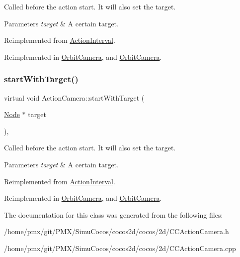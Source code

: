 Called before the action start. It will also set the target.


\begin{DoxyParams}{Parameters}
{\em target} & A certain target. \\
\hline
\end{DoxyParams}


Reimplemented from \hyperlink{classActionInterval_ad3d91186b2c3108488ddbbdbbd982484}{Action\+Interval}.



Reimplemented in \hyperlink{classOrbitCamera_acb7061358c67002d8e7459ec0911f79d}{Orbit\+Camera}, and \hyperlink{classOrbitCamera_ac9e4f661d400a95bf06da3ebb2ad4483}{Orbit\+Camera}.

\mbox{\label{classActionCamera_a8f0cefd9df0f40a71d868e753a8cc3bc}} 
\subsubsection{\texorpdfstring{start\+With\+Target()}{startWithTarget()}\hspace{0.1cm}{\footnotesize\ttfamily [2/2]}}
{\footnotesize\ttfamily virtual void Action\+Camera\+::start\+With\+Target (\begin{DoxyParamCaption}\item[{\hyperlink{classNode}{Node} $\ast$}]{target }\end{DoxyParamCaption})\hspace{0.3cm}{\ttfamily [override]}, {\ttfamily [virtual]}}

Called before the action start. It will also set the target.


\begin{DoxyParams}{Parameters}
{\em target} & A certain target. \\
\hline
\end{DoxyParams}


Reimplemented from \hyperlink{classActionInterval_ad3d91186b2c3108488ddbbdbbd982484}{Action\+Interval}.



Reimplemented in \hyperlink{classOrbitCamera_acb7061358c67002d8e7459ec0911f79d}{Orbit\+Camera}, and \hyperlink{classOrbitCamera_ac9e4f661d400a95bf06da3ebb2ad4483}{Orbit\+Camera}.



The documentation for this class was generated from the following files\+:\begin{DoxyCompactItemize}
\item 
/home/pmx/git/\+P\+M\+X/\+Simu\+Cocos/cocos2d/cocos/2d/C\+C\+Action\+Camera.\+h\item 
/home/pmx/git/\+P\+M\+X/\+Simu\+Cocos/cocos2d/cocos/2d/C\+C\+Action\+Camera.\+cpp\end{DoxyCompactItemize}
